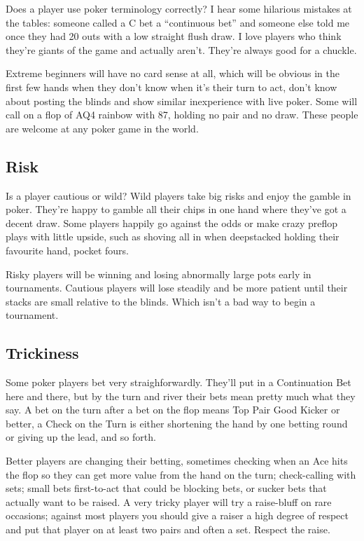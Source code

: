 Does a player use poker terminology correctly? I hear some hilarious
mistakes at the tables: someone called a C bet a ``continuous bet''
and someone else told me once they had 20 outs with a low straight
flush draw. I love players who think they're giants of the game
and actually aren't. They're always good for a chuckle.

Extreme beginners will have no card sense at all, which will be
obvious in the first few hands when they don't know when it's
their turn to act, don't know about posting the blinds and show
similar inexperience with live poker. Some will call on a flop
of AQ4 rainbow with 87, holding no pair and no draw. These people
are welcome at any poker game in the world.

\subsection{Risk}

Is a player cautious or wild? Wild players take big risks and
enjoy the gamble in poker. They're happy to gamble all their chips
in one hand where they've got a decent draw. Some players happily
go against the odds or make crazy preflop plays with little upside,
such as shoving all in when deepstacked holding their favourite
hand, pocket fours.

Risky players will be winning and losing abnormally large pots
early in tournaments. Cautious players will lose steadily and be
more patient until their stacks are small relative to the blinds.
Which isn't a bad way to begin a tournament.

\subsection{Trickiness}

Some poker players bet very straighforwardly. They'll put in a
Continuation Bet here and there, but by the turn and river their bets
mean pretty much what they say. A bet on the turn after a bet on the
flop means Top Pair Good Kicker or better, a Check on the Turn is
either shortening the hand by one betting round or giving up the lead,
and so forth.

Better players are changing their betting, sometimes checking when an
Ace hits the flop so they can get more value from the hand on the
turn; check-calling with sets; small bets first-to-act that could be
blocking bets, or sucker bets that actually want to be raised. A very
tricky player will try a raise-bluff on rare occasions; against most
players you should give a raiser a high degree of respect and put that
player on at least two pairs and often a set. Respect the raise.

